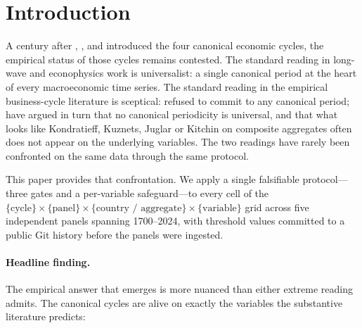 \section{Introduction}
\label{sec:intro}

A century after \citet{kitchin1923}, \citet{juglar1862},
\citet{kuznets1930} and \citet{kondratieff1925} introduced the
four canonical economic cycles, the empirical status of those
cycles remains contested. The standard reading in long-wave and
econophysics work
\citep{perez2002,modelski1987,korotayev_tsirel2010} is
universalist: a single canonical period at the heart of every
macroeconomic time series. The standard reading in the empirical
business-cycle literature is sceptical: \citet{burns_mitchell1946}
refused to commit to any canonical period;
\citet{garvy1943,solomou1987,romer1999,stock_watson2003,wen2005}
have argued in turn that no canonical periodicity is universal,
and that what looks like Kondratieff, Kuznets, Juglar or Kitchin
on composite aggregates often does not appear on the underlying
variables. The two readings have rarely been confronted on the
same data through the same protocol.

This paper provides that confrontation. We apply a single
falsifiable protocol---three gates and a per-variable
safeguard---to every cell of the
\(\{\text{cycle}\}\times\{\text{panel}\}\times\{\text{country / aggregate}\}\times\{\text{variable}\}\)
grid across five independent panels spanning 1700--2024, with
threshold values committed to a public Git history before the
panels were ingested.

\paragraph{Headline finding.}
The empirical answer that emerges is more nuanced than either
extreme reading admits. The canonical cycles are alive on exactly
the variables the substantive literature predicts:

